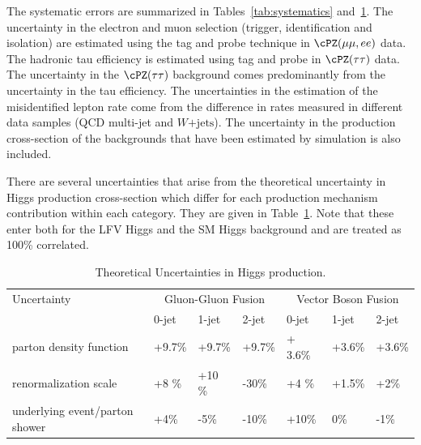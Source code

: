 The systematic errors are summarized in Tables~\ref{tab:systematics} and~\ref{tab:theory_systematics}. The
uncertainty in the electron and muon selection (trigger, identification and isolation) are estimated using
the tag and probe technique in $\cPZ(\mu\mu,ee)$ data. The hadronic tau efficiency is estimated using tag and probe
in $\cPZ(\tau \tau)$ data.
The uncertainty in the
$\cPZ(\tau\tau)$ background comes predominantly from the uncertainty in the tau efficiency.
The uncertainties in the estimation of the misidentified lepton  rate come from the
difference in rates measured in different data samples (QCD multi-jet and $W\mathrm{+jets}$).
The uncertainty in the production
cross-section of the backgrounds that have been  estimated by simulation is also
included.

There are several uncertainties that arise from the theoretical uncertainty in Higgs production cross-section
which differ for each production mechanism contribution within each category. They are given in Table~\ref{tab:theory_systematics}.
Note that these enter both for the LFV Higgs and the SM Higgs background and are treated as 100\% correlated.


\begin{table}[hbtp]
 \begin{center}
  \caption{Theoretical Uncertainties in Higgs production.}
  \label{tab:theory_systematics}
  \vspace{0.1in}
  \begin{tabular}{|l|l|l|l|l|l|l|} \hline
Uncertainty                  &  \multicolumn{3}{c|}{Gluon-Gluon Fusion} &  \multicolumn{3}{c|}{Vector Boson Fusion}  \\ \cline{2-7}
                                &    0-jet  & 1-jet  & 2-jet   & 0-jet & 1-jet  & 2-jet  \\ \hline
parton density function         &    +9.7\%  &  +9.7\% &   +9.7\% & + 3.6\%  &   +3.6\%  &  +3.6\%  \\ \hline
renormalization scale           &    +8 \%   & +10 \%  &  -30\%   & +4 \%    &   +1.5\%  & +2\%   \\ \hline
underlying event/parton shower  &   +4\%     & -5\%   &  -10\%   & +10\%    &   0\%    & -1\%   \\ \hline
  \end{tabular}
 \end{center}
\end{table}
~                

